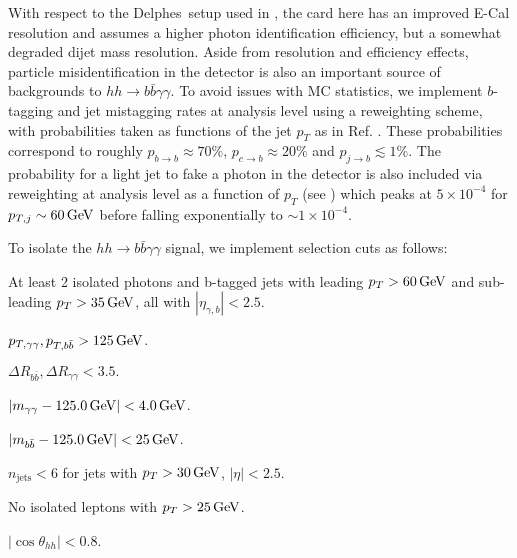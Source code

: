 With respect to the {\sc\small Delphes}\ setup used in \cite{Homiller:2018dgu}, the card here has an improved E-Cal resolution and assumes a higher photon identification efficiency, but a somewhat degraded dijet mass resolution. Aside from resolution and efficiency effects, particle misidentification in the detector is also an important source of backgrounds to $hh\rightarrow b\bar{b}\gamma\gamma$. To avoid issues with MC statistics, we implement $b$-tagging and jet mistagging rates at analysis level using a reweighting scheme, with probabilities taken as functions of the jet $p_T$ as in Ref. \cite{Homiller:2018dgu}. These probabilities correspond to roughly $p_{b\rightarrow b} \approx 70\%$, $p_{c\rightarrow b} \approx 20\%$ and $p_{j\rightarrow b} \lesssim 1\%$. The probability for a light jet to fake a photon in the detector is also included via reweighting at analysis level as a function of $p_T$ (see \cite{Homiller:2018dgu}) which peaks at $5\times 10^{-4}$ for $p_{T,j} \sim 60\, {\rm GeV}$ before falling exponentially to $\sim 1\times 10^{-4}$.



To isolate the $hh \rightarrow b\bar{b}\gamma\gamma$ signal, we implement selection cuts as follows:
\begin{itemize}
\setlength\itemsep{0.25em}
  \item At least 2 isolated photons and b-tagged jets with leading $p_T > 60\, {\rm GeV}$ and sub-leading $p_T > 35\, {\rm GeV}$, all with $|\eta_{\gamma,b}| < 2.5$.
  
\begin{minipage}{0.49\textwidth}
  \item $p_{T,\gamma\gamma}, p_{T,b\bar{b}} > 125\, {\rm GeV}$.
  \item $\Delta R_{b\bar{b}}, \Delta R_{\gamma\gamma} < 3.5.$
  \item $|m_{\gamma\gamma} - 125.0\, {\rm GeV}| < 4.0\, {\rm GeV}$.
  \item $|m_{b\bar{b}} - 125.0\, {\rm GeV}| < 25\, {\rm GeV}$.
\end{minipage}
\begin{minipage}{0.49\textwidth}
  \item $n_{\text{jets}} < 6$ for jets with $p_T > 30\, {\rm GeV}$, $|\eta| < 2.5$.
  \item No isolated leptons with $p_T > 25\, {\rm GeV}$.
  \item $|\cos\theta_{hh}| < 0.8$.
\end{minipage}
\end{itemize}


